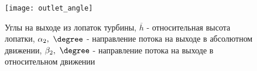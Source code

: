 	\begin{figure}[H]
		\centering
		\texttt{[image: outlet\_angle]}
		\caption{
			Углы на выходе из лопаток турбины,
			$\overline{h}$ - относительная высота лопатки,
			$\alpha_2, \ \degree$ - направление потока на выходе в абсолютном движении,
			$\beta_2, \ \degree$ - направление потока на выходе в относительном движении
		}
		\label{img:profile_outlet_angles}
	\end{figure}

%
%
%
%
%
